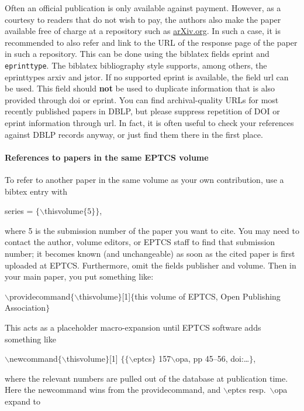\documentclass[submission,copyright,creativecommons]{eptcs}
\begin{document}
Often an official publication is only available against payment. However,
as a courtesy to readers that do not wish to pay, the authors also
make the paper available free of charge at a repository such as
\url{arXiv.org}. In such a case, it is recommended to also refer and
link to the URL of the response page of the paper in such a
repository.  This can be done using the biblatex fields {\ttfamily eprint} and \texttt{eprinttype}.
The biblatex bibliography style supports, among others, the eprinttypes arxiv and jstor.
If no supported eprint is available, the field {\ttfamily url} can be used.
This field should \textbf{not} be used to duplicate information that is also provided through
{\ttfamily doi} or {\ttfamily eprint}. You can find archival-quality URLs for most recently
published papers in DBLP, but please suppress repetition of DOI or {\ttfamily eprint} information
through {\ttfamily url}. In fact, it is often useful to check your references against DBLP records anyway,
or just find them there in the first place.

\paragraph{References to papers in the same EPTCS volume}

To refer to another paper in the same volume as your own contribution,
use a bibtex entry with
\begin{center}
  {\ttfamily series    = $\{\backslash$thisvolume$\{5\}\}$},
\end{center}
where 5 is the submission number of the paper you want to cite.
You may need to contact the author, volume editors, or EPTCS staff to
find that submission number; it becomes known (and unchangeable)
as soon as the cited paper is first uploaded at EPTCS\@.
Furthermore, omit the fields {\ttfamily publisher} and {\ttfamily volume}.
Then in your main paper, you put something like:

\noindent
{\small \ttfamily $\backslash$providecommand$\{\backslash$thisvolume$\}$[1]$\{$this
  volume of EPTCS, Open Publishing Association$\}$}

\noindent
This acts as a placeholder macro-expansion until EPTCS software adds
something like

\noindent
{\small \ttfamily $\backslash$newcommand$\{\backslash$thisvolume$\}$[1]%
  $\{\{\backslash$eptcs$\}$ 157$\backslash$opa, pp 45--56, doi:\dots$\}$},

\noindent
where the relevant numbers are pulled out of the database at publication time.
Here the newcommand wins from the providecommand, and {\ttfamily \small $\backslash$eptcs}
resp.\ {\ttfamily \small $\backslash$opa} expand to
\end{document}
